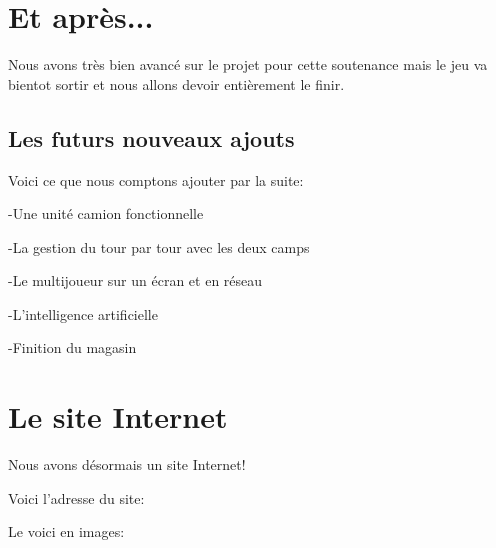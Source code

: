 \documentclass{article}
\begin{document}
\section{Et après...}

\par
Nous avons très bien avancé sur le projet pour cette soutenance mais le jeu va bientot sortir et nous allons devoir entièrement le finir.
\newline

\subsection{Les futurs nouveaux ajouts}

\par
Voici ce que nous comptons ajouter par la suite:
\newline

\par
-Une unité camion fonctionnelle
\newline

\par
-La gestion du tour par tour avec les deux camps
\newline

\par
-Le multijoueur sur un écran et en réseau
\newline

\par
-L'intelligence artificielle
\newline

\par
-Finition du magasin
\newline

\newpage

\section{Le site Internet}

\par
Nous avons désormais un site Internet!
\newline

\par
Voici l'adresse du site:
\newline

\par
Le voici en images:
\newline
\end{document}
